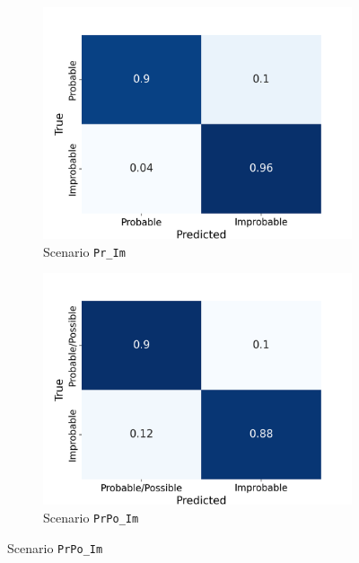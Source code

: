 \documentclass[NewProceedindgs, NoLineNumbers, SectionNumbers, letterpaper, SingleSpace, InsideFigs]{ascelike-new}
\begin{document}
\begin{figure}[ht]
  \centering
  \begin{subfigure}[t]{.45\linewidth}
    \centering
    \includegraphics[width=\linewidth, trim={0 0 1cm 1cm}, clip]{opt-confusion-matrix-Pr_Im-128-px.png}
    \caption{Scenario \texttt{Pr\_Im}}
    \label{pr_im_cm}
  \end{subfigure}%
   \begin{subfigure}[t]{.45\linewidth}
    \centering
    \includegraphics[width=\linewidth, trim={0 0 1cm 1cm}, clip]{opt-confusion-matrix-PrPo_Im-128-px.png}
    \caption{Scenario \texttt{PrPo\_Im}}
    \label{prpo_im_cm}
  \end{subfigure}%
  

\end{figure}
\end{document}
